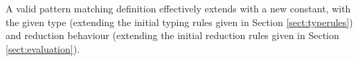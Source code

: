 A valid pattern matching definition effectively extends \TT{} with a new
constant, with the given type (extending the initial typing rules given in
Section \ref{sect:typerules}) and reduction behaviour (extending the initial
reduction rules given in Section \ref{sect:evaluation}). 


% 
% 
% 
% 
% 
